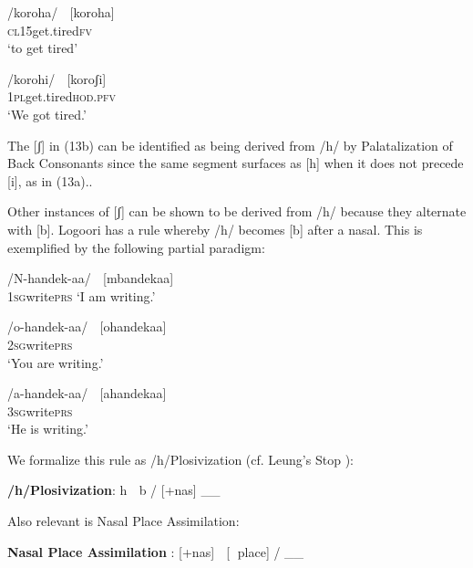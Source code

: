 \documentclass[output=paper]{langsci/langscibook}
\begin{document}
\ea{}
 /koroha/    [koroha]\\{}
\textsc{cl15}get.tired\textsc{fv}\\{}
\glt ‘to get tired’ \citep[38]{Leung1991}
\z

\ea{}
 /korohi/    [koroʃi]\\{}
\textsc{1pl}get.tired\textsc{hod.pfv}\\{}
\glt ‘We got tired.’ \citep[38]{Leung1991}
\z

The [ʃ] in (13b) can be identified as being derived from /h/ by Palatalization of Back Consonants since the same segment surfaces as [h] when it does not precede [i], as in (13a).. 

Other instances of [ʃ] can be shown to be derived from /h/ because they alternate with [b]. Logoori has a rule whereby /h/ becomes [b] after a nasal. This is exemplified by the following partial paradigm:

\ea{}
/N-handek-aa/    [mbandekaa] \\{}
\textsc{1sg}write\textsc{prs}
\glt ‘I am writing.’
\z

\ea{}
/o-handek-aa/    [ohandekaa]\\{}
\textsc{2sg}write\textsc{prs}\\{}
\glt ‘You are writing.’
\z


\ea{}
/a-handek-aa/    [ahandekaa]\\{}
\textsc{3sg}write\textsc{prs}\\{}
\glt ‘He is writing.’
\z


We formalize this rule as /h/Plosivization (cf. Leung’s Stop \citet[117]{Formation1991}):



\ea{}
\textbf{/h/Plosivization}: h  b / [+nas] \_\_ {\rmfnm}
\z
{}




Also relevant is Nasal Place Assimilation:


\ea{}
\textbf{Nasal Place Assimilation} \citep[116]{Leung1991}: [+nas]  [ place] / \_\_ 
\z
\end{document}
